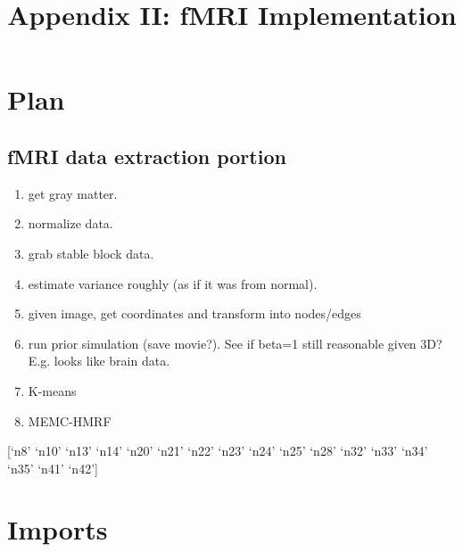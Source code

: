 \documentclass{article}
\title{Appendix II: fMRI Implementation}
\begin{document}
    
    
    \maketitle
    
    

    
    \section{Plan}

\subsection{fMRI data extraction portion}

\begin{enumerate}[1.]
\item
  get gray matter.
\item
  normalize data.
\item
  grab stable block data.
\item
  estimate variance roughly (as if it was from normal).
\item
  given image, get coordinates and transform into nodes/edges
\item
  run prior simulation (save movie?). See if beta=1 still reasonable
  given 3D? E.g. looks like brain data.
\item
  K-means
\item
  MEMC-HMRF
\end{enumerate}

{[}`n8' `n10' `n13' `n14' `n20' `n21' `n22' `n23' `n24' `n25' `n28'
`n32' `n33' `n34' `n35' `n41' `n42'{]}

    \section{Imports}
\end{document}
